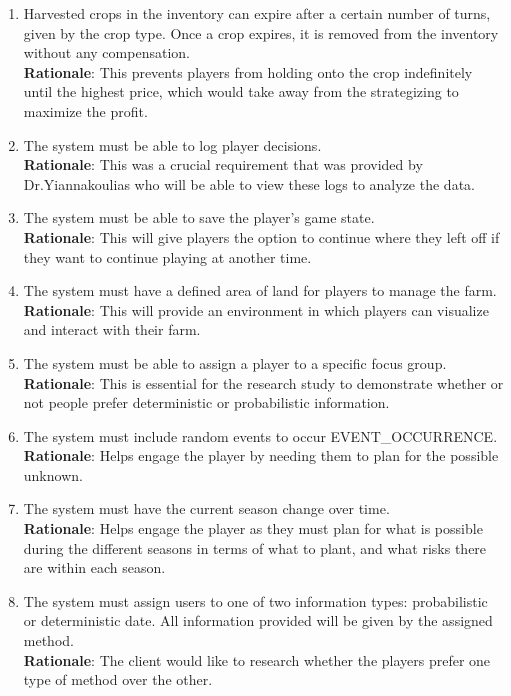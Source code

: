 \documentclass{article}
\begin{document}
\begin{enumerate}[{FR}1. ]
    \item \label{FR15} Harvested crops in the inventory can expire after a certain number of turns, given by the crop type. Once a crop expires, it is removed from the inventory without any compensation.\\
    \textbf{Rationale}: This prevents players from holding onto the crop indefinitely until the highest price, which would take away from the strategizing to maximize the profit.
    \item \label{FR16} The system must be able to log player decisions.\\
    \textbf{Rationale}: This was a crucial requirement that was provided by Dr.Yiannakoulias who will be able to view these logs to analyze the data.
    \item \label{FR17} The system must be able to save the player's game state.\\
    \textbf{Rationale}: This will give players the option to continue where they left off if they want to continue playing at another time.
    \item \label{FR18} The system must have a defined area of land for players to manage the farm.\\
    \textbf{Rationale}: This will provide an environment in which players can visualize and interact with their farm.
    \item \label{FR19} The system must be able to assign a player to a specific focus group.\\
    \textbf{Rationale}: This is essential for the research study to demonstrate whether or not people prefer deterministic or probabilistic information.
    \item \label{FR20} The system must include random events to occur EVENT\_OCCURRENCE.\\
    \textbf{Rationale}: Helps engage the player by needing them to plan for the possible unknown.
    \item \label{FR21} The system must have the current season change over time.\\
    \textbf{Rationale}: Helps engage the player as they must plan for what is possible during the different seasons in terms of what to plant, and what risks there are within each season.
    \item \label{FR22} The system must assign users to one of two information types: probabilistic or deterministic date. All information provided will be given by the assigned method. \\
    \textbf{Rationale}: The client would like to research whether the players prefer one type of method over the other. 
\end{enumerate}
\end{document}
